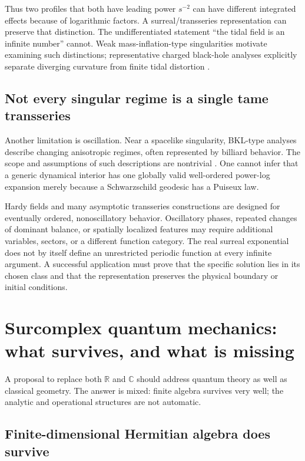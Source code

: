 \documentclass[11pt,letterpaper]{article}
\newcommand{\R}{\mathbb{R}}
\newcommand{\C}{\mathbb{C}}
\theoremstyle{definition}
\theoremstyle{remark}
\begin{document}
Thus two profiles that both have leading power $s^{-2}$ can have different
integrated effects because of logarithmic factors. A surreal/transseries
representation can preserve that distinction. The undifferentiated statement
``the tidal field is an infinite number'' cannot. Weak mass-inflation-type
singularities motivate examining such distinctions; representative charged
black-hole analyses explicitly separate diverging curvature from finite tidal
distortion \cite{Bhattacharjee}.

\subsection{Not every singular regime is a single tame transseries}

Another limitation is oscillation. Near a spacelike singularity, BKL-type
analyses describe changing anisotropic regimes, often represented by billiard
behavior. The scope and assumptions of such descriptions are nontrivial
\cite{DamourHenneauxNicolai}. One cannot infer that a generic dynamical interior
has one globally valid well-ordered power-log expansion merely because a
Schwarzschild geodesic has a Puiseux law.

Hardy fields and many asymptotic transseries constructions are designed for
eventually ordered, nonoscillatory behavior. Oscillatory phases, repeated
changes of dominant balance, or spatially localized features may require
additional variables, sectors, or a different function category. The real
surreal exponential does not by itself define an unrestricted periodic
function at every infinite argument. A successful application must prove that
the specific solution lies in its chosen class and that the representation
preserves the physical boundary or initial conditions.

\section{Surcomplex quantum mechanics: what survives, and what is missing}
\label{sec:quantum}

A proposal to replace both $\R$ and $\C$ should address quantum theory as well
as classical geometry. The answer is mixed: finite algebra survives very well;
the analytic and operational structures are not automatic.

\subsection{Finite-dimensional Hermitian algebra does survive}
\end{document}
